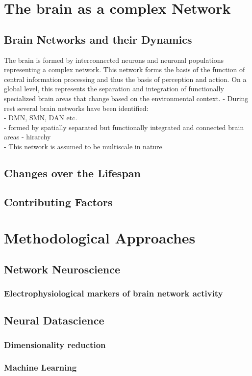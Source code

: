\section{The brain as a complex Network}
	\subsection{Brain Networks and their Dynamics}
	The brain is formed by interconnected neurons and neuronal populations representing a complex network. 
	This network forms the basis of the function of central information processing and thus the basis of 
	perception and action. On a global level, this represents the separation and integration of functionally 
	specialized brain areas that change based on the environmental context. 
	- During rest several brain networks have been identified:\\
	    - DMN, SMN, DAN etc. \\ 
		- formed by spatially separated but functionally integrated and connected brain areas
		- hirarchy\\
	- This network is assumed to be multiscale in nature \\
	\subsection{Changes over the Lifespan}
	\subsection{Contributing Factors}
\section{Methodological Approaches}
	\subsection{Network Neuroscience}
		\subsubsection{Electrophysiological markers of brain network activity}
	\subsection{Neural Datascience}
		\subsubsection{Dimensionality reduction}
		\subsubsection{Machine Learning}
